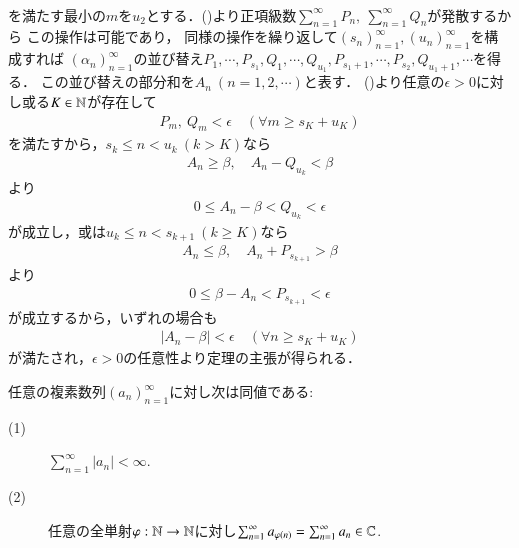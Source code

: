 \begin{prf}
\begin{align}
		\end{align}
		を満たす最小の$m$を$u_2$とする．()より正項級数$\sum_{n=1}^{\infty} P_n,\ \sum_{n=1}^{\infty} Q_n$が発散するから
		この操作は可能であり，
		同様の操作を繰り返して$(s_n)_{n=1}^{\infty},(u_n)_{n=1}^{\infty}$を構成すれば
		$(\alpha_n)_{n=1}^{\infty}$の並び替え$P_1,\cdots,P_{s_1},Q_1,\cdots,Q_{u_1},P_{s_1+1},\cdots,P_{s_2},Q_{u_1+1},\cdots$を得る．
		この並び替えの部分和を$A_n\ (n=1,2,\cdots)$と表す．
		()より任意の$\epsilon > 0$に対し或る$K \in \mathbb{N}$が存在して
		\begin{align}
			P_m,\ Q_m < \epsilon
			\quad ( \forall m \geq s_K + u_K )
		\end{align}
		を満たすから，$s_k \leq n < u_k\ (k > K)$なら
		\begin{align}
			A_n \geq \beta,
			\quad A_n - Q_{u_k} < \beta
		\end{align}
		より
		\begin{align}
			0 \leq A_n - \beta < Q_{u_k} < \epsilon
		\end{align}
		が成立し，或は$u_k \leq n < s_{k+1}\ (k \geq K)$なら
		\begin{align}
			A_n \leq \beta,
			\quad A_n + P_{s_{k+1}} > \beta
		\end{align}
		より
		\begin{align}
			0 \leq \beta - A_n < P_{s_{k+1}} < \epsilon
		\end{align}
		が成立するから，いずれの場合も
		\begin{align}
			|A_n - \beta| < \epsilon \quad ( \forall n \geq s_K + u_K )
		\end{align}
		が満たされ，$\epsilon > 0$の任意性より定理の主張が得られる．
		\QED
	\end{prf}
	
	\begin{screen}
		\begin{cor}[絶対収束と無条件収束は同値]
			任意の複素数列$(a_n)_{n=1}^{\infty}$に対し次は同値である:
			\begin{description}
				\item[(1)] $\sum_{n=1}^{\infty} |a_n| < \infty$.
				\item[(2)] 任意の全単射$\varphi:\mathbb{N} \rightarrow \mathbb{N}$に対し$\sum_{n=1}^{\infty} a_{\varphi(n)} = \sum_{n=1}^{\infty} a_n \in \mathbb{C}$.
			\end{description}
		\end{cor}
	\end{screen}
	
